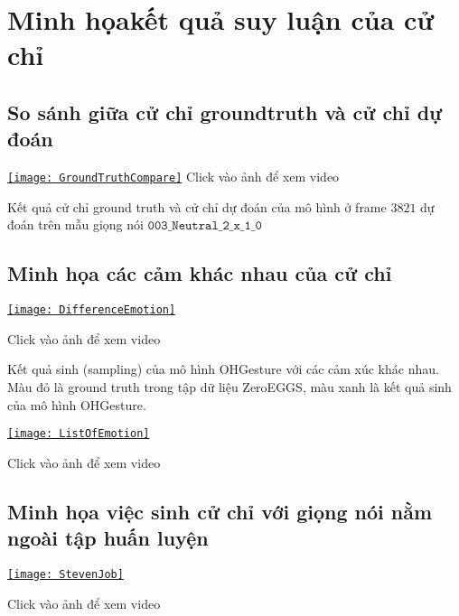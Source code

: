 \chapter{Minh họakết quả suy luận của cử chỉ}
\label{Appendix3}

\section{So sánh giữa cử chỉ groundtruth và cử chỉ dự đoán}


\begin{center}
\centering
\href{https://youtu.be/22lNm2tvmrk}{%
\texttt{[image: GroundTruthCompare]}}
{\tiny Click vào ảnh để xem video}
\end{center}

Kết quả cử chỉ ground truth và cử chỉ dự đoán của mô hình ở frame $3821$ dự đoán trên mẫu giọng nói $\texttt{003\_Neutral\_2\_x\_1\_0}$

\section{Minh họa các cảm khác nhau của cử chỉ}

{
	\begin{center}
		\centering
		\href{https://youtu.be/KUlBZXLtYJ4}{%
			\texttt{[image: DifferenceEmotion]}}
		
		{\tiny Click vào ảnh để xem video}
	\end{center}
}

Kết quả sinh (sampling) của mô hình OHGesture với các cảm xúc khác nhau. Màu đỏ là ground truth trong tập dữ liệu ZeroEGGS, màu xanh là kết quả sinh của mô hình OHGesture.

{
	\begin{center}
		\centering
		\href{https://youtu.be/eZghfNGmZn8}{%
			\texttt{[image: ListOfEmotion]}}
		
		{\tiny Click vào ảnh để xem video}
	\end{center}
}

\section{Minh họa việc sinh cử chỉ với giọng nói nằm ngoài tập huấn luyện}

{
	\begin{center}
		\centering
		\href{https://www.youtube.com/watch?v=B6nv1kQmi-Q}{%
		\texttt{[image: StevenJob]}}
		
		{\tiny Click vào ảnh để xem video}
	\end{center}
}

